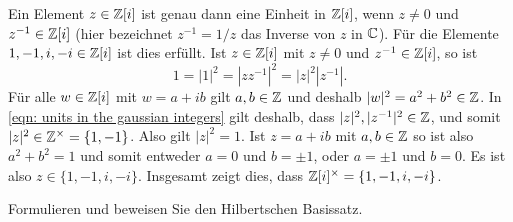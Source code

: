 \begin{solution}
  Ein Element $z \in \mathbb{Z}[i]$ ist genau dann eine Einheit in $\mathbb{Z}[i]$, wenn $z \neq 0$ und $z^{-1} \in \mathbb{Z}[i]$ (hier bezeichnet $z^{-1} = 1/z$ das Inverse von $z$ in $\mathbb{C}$).
  Für die Elemente $1, -1, i, -i \in \mathbb{Z}[i]$ ist dies erfüllt.
  Ist $z \in \mathbb{Z}[i]$ mit $z \neq 0$ und $z^{-1} \in \mathbb{Z}[i]$, so ist
  \begin{equation}
    \label{eqn: units in the gaussian integers}
      1
    = |1|^2
    = |z z^{-1}|^2
    = |z|^2 |z^{-1}|.
  \end{equation}
  Für alle $w \in \mathbb{Z}[i]$ mit $w = a + ib$ gilt $a, b \in \mathbb{Z}$ und deshalb $|w|^2 = a^2 + b^2 \in \mathbb{Z}$.
  In \eqref{eqn: units in the gaussian integers} gilt deshalb, dass $|z|^2, |z^{-1}|^2 \in \mathbb{Z}$, und somit $|z|^2 \in \mathbb{Z}^\times = \{1,-1\}$.
  Also gilt $|z|^2 = 1$.
  Ist $z = a + ib$ mit $a,b \in \mathbb{Z}$ so ist also $a^2 + b^2 = 1$ und somit entweder $a = 0$ und $b = \pm 1$, oder $a = \pm 1$ und $b = 0$.
  Es ist also $z \in \{1, -1, i, -i\}$.
  Insgesamt zeigt dies, dass $\mathbb{Z}[i]^\times = \{1, -1, i, -i\}$.
\end{solution}


\begin{question}
  Formulieren und beweisen Sie den Hilbertschen Basissatz.
\end{question}


